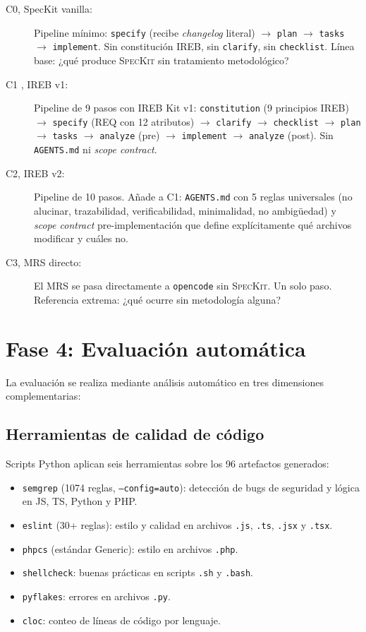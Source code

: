 \begin{description}
    \item[C0,  SpecKit vanilla:] Pipeline m\'inimo: \texttt{specify} (recibe \emph{changelog} literal) $\rightarrow$ \texttt{plan} $\rightarrow$ \texttt{tasks} $\rightarrow$ \texttt{implement}. Sin constituci\'on IREB, sin \texttt{clarify}, sin \texttt{checklist}. L\'inea base: ¿qu\'e produce \textsc{SpecKit} sin tratamiento metodol\'ogico?

    \item[C1 , IREB v1:] Pipeline de 9 pasos con IREB Kit v1: \texttt{constitution} (9 principios IREB) $\rightarrow$ \texttt{specify} (REQ con 12 atributos) $\rightarrow$ \texttt{clarify} $\rightarrow$ \texttt{checklist} $\rightarrow$ \texttt{plan} $\rightarrow$ \texttt{tasks} $\rightarrow$ \texttt{analyze} (pre) $\rightarrow$ \texttt{implement} $\rightarrow$ \texttt{analyze} (post). Sin \texttt{AGENTS.md} ni \emph{scope contract}.

    \item[C2,  IREB v2:] Pipeline de 10 pasos. A\~nade a C1: \texttt{AGENTS.md} con 5 reglas universales (no alucinar, trazabilidad, verificabilidad, minimalidad, no ambig\"uedad) y \emph{scope contract} pre-implementaci\'on que define expl\'icitamente qu\'e archivos modificar y cu\'ales no.

    \item[C3,  MRS directo:] El MRS se pasa directamente a \texttt{opencode} sin \textsc{SpecKit}. Un solo paso. Referencia extrema: ¿qu\'e ocurre sin metodolog\'ia alguna?
\end{description}

\section{Fase 4: Evaluaci\'on autom\'atica}

La evaluaci\'on se realiza mediante an\'alisis autom\'atico en tres dimensiones complementarias:

\subsection{Herramientas de calidad de c\'odigo}

Scripts Python aplican seis herramientas sobre los 96 artefactos generados:

\begin{itemize}
    \item \texttt{semgrep} (1074 reglas, \texttt{--config=auto}): detecci\'on de bugs de seguridad y l\'ogica en JS, TS, Python y PHP.
    \item \texttt{eslint} (30+ reglas): estilo y calidad en archivos \texttt{.js}, \texttt{.ts}, \texttt{.jsx} y \texttt{.tsx}.
    \item \texttt{phpcs} (est\'andar Generic): estilo en archivos \texttt{.php}.
    \item \texttt{shellcheck}: buenas pr\'acticas en scripts \texttt{.sh} y \texttt{.bash}.
    \item \texttt{pyflakes}: errores en archivos \texttt{.py}.
    \item \texttt{cloc}: conteo de l\'ineas de c\'odigo por lenguaje.
\end{itemize}

